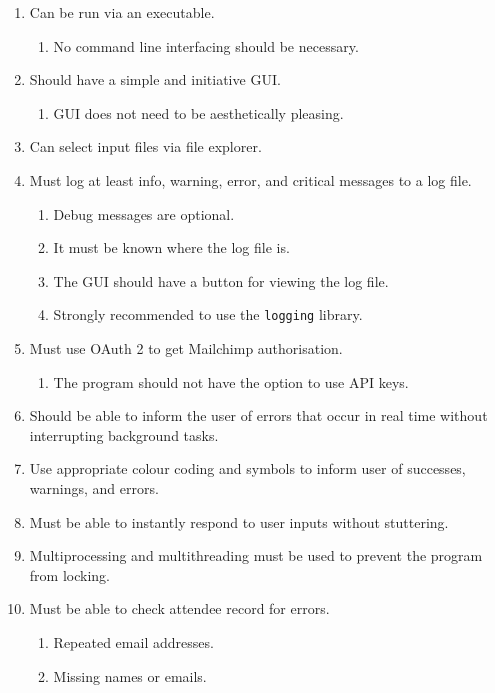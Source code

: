 \documentclass[11pt]{article}
\begin{document}
\begin{enumerate}
    \item Can be run via an executable.
    \begin{enumerate}
        \item No command line interfacing should be necessary.
    \end{enumerate}
    \item Should have a simple and initiative GUI.
    \begin{enumerate}
        \item GUI does not need to be aesthetically pleasing.
    \end{enumerate}
    \item Can select input files via file explorer.
    \item Must log at least info, warning, error, and critical messages to a log file.
    \begin{enumerate}
        \item Debug messages are optional.
        \item It must be known where the log file is.
        \item The GUI should have a button for viewing the log file.
        \item Strongly recommended to use the \texttt{logging} library.
    \end{enumerate}
    \item Must use OAuth 2 to get Mailchimp authorisation.
    \begin{enumerate}
        \item The program should not have the option to use API keys.
    \end{enumerate}
    \item Should be able to inform the user of errors that occur in real time without interrupting background tasks.
    \item Use appropriate colour coding and symbols to inform user of successes, warnings, and errors.
    \item Must be able to instantly respond to user inputs without stuttering.
    \item Multiprocessing and multithreading must be used to prevent the program from locking.
    \item Must be able to check attendee record for errors.
    \begin{enumerate}
        \item Repeated email addresses.
        \item Missing names or emails.

\end{enumerate}
\end{enumerate}
\end{document}
